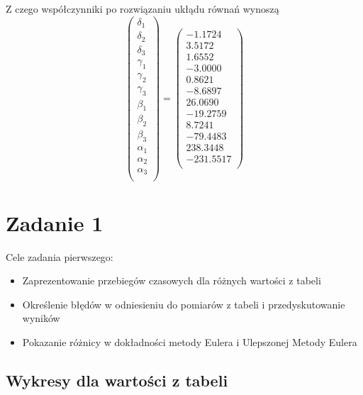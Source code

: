 \documentclass[varwidth,12pt,a4paper]{article}
\begin{document}
Z czego współczynniki po rozwiązaniu ukłądu równań wynoszą
$$
\left( \begin{array}{c}
\delta _1\\
\delta_2\\
\delta_3\\
\gamma _1\\
\gamma _2\\
\gamma_3\\
\beta _1\\
\beta _2\\
\beta _3\\
\alpha _1\\
\alpha _2\\
\alpha _3 \\
\end{array} \right) = \left( \begin{array}{c}
-1.1724 \\
3.5172 \\
1.6552 \\
-3.0000 \\
0.8621 \\
-8.6897 \\
26.0690 \\
-19.2759 \\
8.7241 \\
-79.4483 \\
238.3448 \\
-231.5517 \\
\end{array} \right) 
$$

\section{Zadanie 1}

Cele zadania pierwszego:

\begin{itemize}
  \item Zaprezentowanie przebiegów czasowych dla różnych wartości z tabeli
  \item Określenie błędów w odniesieniu do pomiarów z tabeli i przedyskutowanie wyników
  \item Pokazanie różnicy w dokładności metody Eulera i Ulepszonej Metody Eulera
\end{itemize}

\subsection{Wykresy dla wartości z tabeli}
\end{document}
